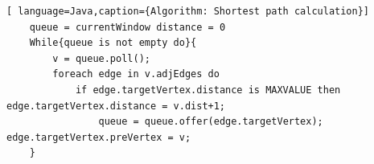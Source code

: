 \begin{lstlisting}[ language=Java,caption={Algorithm: Shortest path calculation}]
    queue = currentWindow distance = 0
    While{queue is not empty do}{
        v = queue.poll();
        foreach edge in v.adjEdges do
            if edge.targetVertex.distance is MAXVALUE then              edge.targetVertex.distance = v.dist+1;
                queue = queue.offer(edge.targetVertex); edge.targetVertex.preVertex = v;
    }
\end{lstlisting}